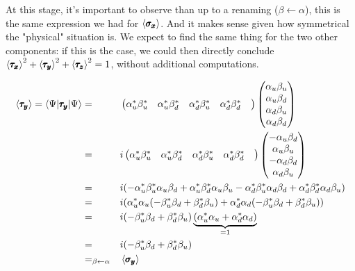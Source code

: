 \documentclass[solutions.tex]{subfiles}
\begin{document}
\begin{remark} At this stage, it's important to observe than up
to a renaming ($\beta \leftarrow \alpha$), this is the same expression
we had for $\left\langle \pmb{\sigma_x} \right\rangle$. And it makes sense given how symmetrical
the "physical" situation is. We expect to find the same thing for the
two other components: if this is the case, we could then directly
conclude $\left\langle \pmb{\tau_x} \right\rangle^2+\left\langle \pmb{\tau_y} \right\rangle^2+\left\langle \pmb{\tau_z} \right\rangle^2 =1$,
without additional computations.
\end{remark}

\begin{equation*}\begin{aligned}
	\left\langle \pmb{\tau_y} \right\rangle = \langle \Psi|\pmb{\tau_y}|\Psi\rangle
		&=&& \begin{pmatrix}
			\alpha_u^*\beta_u^* &
			\alpha_u^*\beta_d^* &
			\alpha_d^*\beta_u^* &
			\alpha_d^*\beta_d^* &
		\end{pmatrix}\begin{pmatrix}
			\alpha_u\beta_u \\
			\alpha_u\beta_d \\
			\alpha_d\beta_u \\
			\alpha_d\beta_d \\
		\end{pmatrix} \\
	~ &=&& i\begin{pmatrix}
			\alpha_u^*\beta_u^* &
			\alpha_u^*\beta_d^* &
			\alpha_d^*\beta_u^* &
			\alpha_d^*\beta_d^* &
		\end{pmatrix}\begin{pmatrix}
			-\alpha_u\beta_d \\
			\alpha_u\beta_u \\
			-\alpha_d\beta_d \\
			\alpha_d\beta_u \\
		\end{pmatrix} \\
	~ &=&& i(-\alpha_u^*\beta_u^*\alpha_u\beta_d
			+\alpha_u^*\beta_d^*\alpha_u\beta_u
			-\alpha_d^*\beta_u^*\alpha_d\beta_d
			+\alpha_d^*\beta_d^*\alpha_d\beta_u) \\
	~ &=&&i(\alpha_u^*\alpha_u(
			-\beta_u^*\beta_d + \beta_d^*\beta_u
		) + \alpha_d^*\alpha_d(
			-\beta_u^*\beta_d + \beta_d^*\beta_u
		)) \\
	~ &=&& i(-\beta_u^*\beta_d + \beta_d^*\beta_u)
		\underbrace{(\alpha_u^*\alpha_u + \alpha_d^*\alpha_d)}_{=1} \\
	~ &=&& i(-\beta_u^*\beta_d + \beta_d^*\beta_u) \\
	~ &=_{\beta \leftarrow \alpha}&& \left\langle \pmb{\sigma_y} \right\rangle
\end{aligned}\end{equation*}
\end{document}
